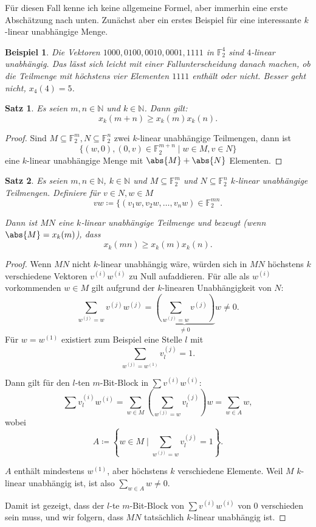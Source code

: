 \documentclass[a4paper]{scrartcl}
\theoremstyle{break}
\newtheorem{theorem}{Satz}
\newtheorem{example}{Beispiel}
\newcommand{\N}{\mathbb{N}}
\newcommand{\F}{\mathbb{F}}
\begin{document}
Für diesen Fall kenne ich keine allgemeine Formel, aber immerhin eine erste Abschätzung nach unten. Zunächst aber ein erstes Beispiel
für eine interessante $k$-linear unabhängige Menge.

\begin{example}
  Die Vektoren $1000, 0100, 0010, 0001, 1111$ in $\F_2^4$ sind $4$-linear unabhängig. Das lässt sich leicht mit einer Fallunterscheidung
  danach machen, ob die Teilmenge mit höchstens vier Elementen $1111$ enthält oder nicht. Besser geht nicht, $x_4(4) = 5$.
\end{example}

\begin{theorem}
  Es seien $m, n \in \N$ und $k \in \N$. Dann gilt:
  \[
    x_k(m + n) \ge x_k(m) x_k(n)
  .\]
\end{theorem}
\begin{proof}
  Sind $M \subseteq \F_2^m, N \subseteq \F_2^n$ zwei $k$-linear unabhängige Teilmengen, dann ist
  \[
    \{ (w, 0), (0, v) \in \F_2^{m+n} \mid w \in M, v \in N \}
  \]
  eine $k$-linear unabhängige Menge mit $\abs{M} + \abs{N}$ Elementen.
\end{proof}

\begin{theorem}
  Es seien $m, n \in \N$, $k \in \N$ und $M \subseteq \F_2^m$ und $N \subseteq \F_2^n$ $k$-linear unabhängige Teilmengen.
  Definiere für $v\in N, w \in M$
  \[
    vw \coloneqq \{ (v_1 w, v_2 w, \ldots, v_n w) \in \F_2^{mn}
  .\]
  
  Dann ist $MN$ eine $k$-linear unabhängige Teilmenge und bezeugt (wenn $\abs{M} = x_k(m)$), dass
  \[
    x_k(mn) \ge x_k(m) x_k(n)
  .\]
\end{theorem}
\begin{proof}
  Wenn $MN$ nicht $k$-linear unabhängig wäre, würden sich in $MN$ höchstens $k$ verschiedene Vektoren $v^{(i)}w^{(i)}$ zu Null aufaddieren.
  Für alle als $w^{(i)}$ vorkommenden $w \in M$ gilt aufgrund der $k$-linearen Unabhängigkeit von $N$:
  \[
    \sum_{w^{(j)}=w} v^{(j)}w^{(j)} = \underbrace{\left(\sum_{w^{(j)} = w} v^{(j)}\right)}_{\ne 0}w \ne 0
  .\]
  Für $w = w^{(1)}$ existiert zum Beispiel eine Stelle $l$ mit
  \[
    \sum_{w^{(j)} = w^{(1)}} v^{(j)}_l = 1
  .\]
  
  Dann gilt für den $l$-ten $m$-Bit-Block in $\sum v^{(i)} w^{(i)}$:
  \[
    \sum v^{(i)}_l w^{(i)} = \sum_{w \in M} \left(\sum_{w^{(j)} = w} v^{(j)}_l\right)w = \sum_{w\in A} w
  ,\]
  wobei
  \[
    A \coloneqq \left\{ w\in M \mid \sum_{w^{(j)} = w} v^{(j)}_l = 1 \right\}
  .\]
  
  $A$ enthält mindestens $w^{(1)}$, aber höchstens $k$ verschiedene Elemente.
  Weil $M$ $k$-linear unabhängig ist, ist also $\sum_{w\in A} w \ne 0$.

  Damit ist gezeigt, dass der $l$-te $m$-Bit-Block von $\sum v^{(i)} w^{(i)}$ von $0$ verschieden sein muss,
  und wir folgern, dass $MN$ tatsächlich $k$-linear unabhängig ist.
\end{proof}
\end{document}
